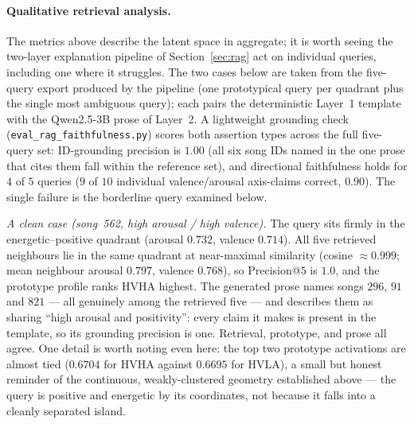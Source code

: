\documentclass[12pt]{report}
\begin{document}
\paragraph{Qualitative retrieval analysis.} The metrics above describe the latent space in aggregate; it is worth seeing the two-layer explanation pipeline of Section~\ref{sec:rag} act on individual queries, including one where it struggles. The two cases below are taken from the five-query export produced by the pipeline (one prototypical query per quadrant plus the single most ambiguous query); each pairs the deterministic Layer~1 template with the Qwen2.5-3B prose of Layer~2. A lightweight grounding check (\texttt{eval\_rag\_faithfulness.py}) scores both assertion types across the full five-query set: ID-grounding precision is $1.00$ (all six song IDs named in the one prose that cites them fall within the reference set), and directional faithfulness holds for $4$ of $5$ queries ($9$ of $10$ individual valence/arousal axis-claims correct, $0.90$). The single failure is the borderline query examined below.

\emph{A clean case (song~562, high arousal / high valence).} The query sits firmly in the energetic--positive quadrant (arousal $0.732$, valence $0.714$). All five retrieved neighbours lie in the same quadrant at near-maximal similarity (cosine $\approx 0.999$; mean neighbour arousal $0.797$, valence $0.768$), so Precision@$5$ is $1.0$, and the prototype profile ranks HVHA highest. The generated prose names songs $296$, $91$ and $821$ --- all genuinely among the retrieved five --- and describes them as sharing ``high arousal and positivity'': every claim it makes is present in the template, so its grounding precision is one. Retrieval, prototype, and prose all agree. One detail is worth noting even here: the top two prototype activations are almost tied ($0.6704$ for HVHA against $0.6695$ for HVLA), a small but honest reminder of the continuous, weakly-clustered geometry established above --- the query is positive and energetic by its coordinates, not because it falls into a cleanly separated island.
\end{document}
